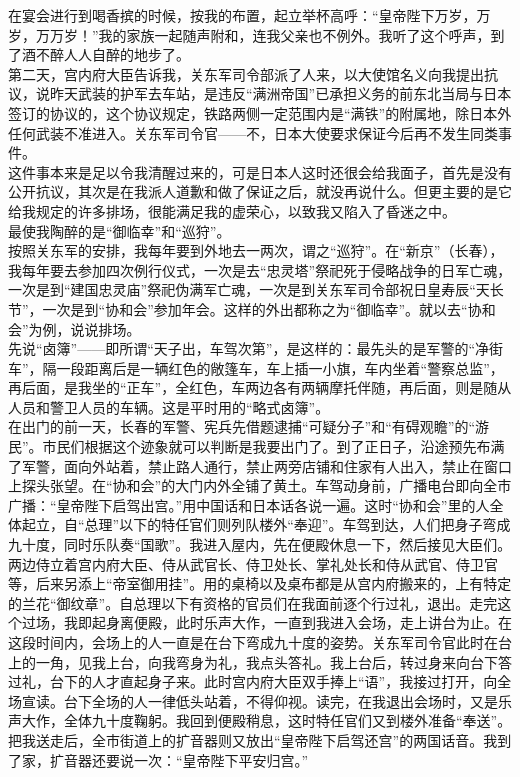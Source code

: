 在宴会进行到喝香摈的时候，按我的布置，起立举杯高呼：“皇帝陛下万岁，万岁，万万岁！”我的家族一起随声附和，连我父亲也不例外。我听了这个呼声，到了酒不醉人人自醉的地步了。\\

第二天，宫内府大臣告诉我，关东军司令部派了人来，以大使馆名义向我提出抗议，说昨天武装的护军去车站，是违反“满洲帝国”已承担义务的前东北当局与日本签订的协议的，这个协议规定，铁路两侧一定范围内是“满铁”的附属地，除日本外任何武装不准进入。关东军司令官——不，日本大使要求保证今后再不发生同类事件。\\

这件事本来是足以令我清醒过来的，可是日本人这时还很会给我面子，首先是没有公开抗议，其次是在我派人道歉和做了保证之后，就没再说什么。但更主要的是它给我规定的许多排场，很能满足我的虚荣心，以致我又陷入了昏迷之中。\\

最使我陶醉的是“御临幸”和“巡狩”。\\

按照关东军的安排，我每年要到外地去一两次，谓之“巡狩”。在“新京”（长春），我每年要去参加四次例行仪式，一次是去“忠灵塔”祭祀死于侵略战争的日军亡魂，一次是到“建国忠灵庙”祭祀伪满军亡魂，一次是到关东军司令部祝日皇寿辰“天长节”，一次是到“协和会”参加年会。这样的外出都称之为“御临幸”。就以去“协和会”为例，说说排场。\\

先说“卤簿”——即所谓“天子出，车驾次第”，是这样的：最先头的是军警的“净街车”，隔一段距离后是一辆红色的敞篷车，车上插一小旗，车内坐着“警察总监”，再后面，是我坐的“正车”，全红色，车两边各有两辆摩托伴随，再后面，则是随从人员和警卫人员的车辆。这是平时用的“略式卤簿”。\\

在出门的前一天，长春的军警、宪兵先借题逮捕“可疑分子”和“有碍观瞻”的“游民”。市民们根据这个迹象就可以判断是我要出门了。到了正日子，沿途预先布满了军警，面向外站着，禁止路人通行，禁止两旁店铺和住家有人出入，禁止在窗口上探头张望。在“协和会”的大门内外全铺了黄土。车驾动身前，广播电台即向全市广播：“皇帝陛下启驾出宫。”用中国话和日本话各说一遍。这时“协和会”里的人全体起立，自“总理”以下的特任官们则列队楼外“奉迎”。车驾到达，人们把身子弯成九十度，同时乐队奏“国歌”。我进入屋内，先在便殿休息一下，然后接见大臣们。两边侍立着宫内府大臣、侍从武官长、侍卫处长、掌礼处长和侍从武官、侍卫官等，后来另添上“帝室御用挂”。用的桌椅以及桌布都是从宫内府搬来的，上有特定的兰花“御纹章”。自总理以下有资格的官员们在我面前逐个行过礼，退出。走完这个过场，我即起身离便殿，此时乐声大作，一直到我进入会场，走上讲台为止。在这段时间内，会场上的人一直是在台下弯成九十度的姿势。关东军司令官此时在台上的一角，见我上台，向我弯身为礼，我点头答礼。我上台后，转过身来向台下答过礼，台下的人才直起身子来。此时宫内府大臣双手捧上“语”，我接过打开，向全场宣读。台下全场的人一律低头站着，不得仰视。读完，在我退出会场时，又是乐声大作，全体九十度鞠躬。我回到便殿稍息，这时特任官们又到楼外准备“奉送”。把我送走后，全市街道上的扩音器则又放出“皇帝陛下启驾还宫”的两国话音。我到了家，扩音器还要说一次：“皇帝陛下平安归宫。”\\

